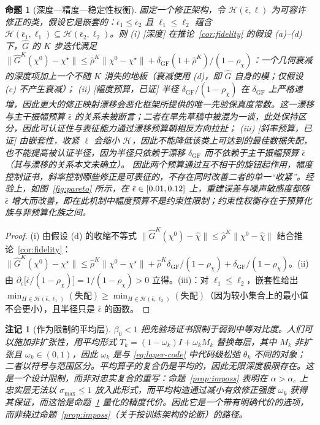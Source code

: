 \documentclass[UTF8,a4paper,11pt]{ctexart}
\newcommand{\norm}[1]{\lVert #1 \rVert}
\newcommand{\numv}[1]{#1}
\newtheorem{Proposition}{命题}[section]
\newtheorem{Remark}{注记}[section]
\begin{document}
\begin{Proposition}[深度—精度—稳定性权衡]\label{prop:tri}
固定一个修正架构，令 $\mathcal{H}(\bar\epsilon,\ell)$ 为可容许修正的类，假设它是嵌套的：$\bar\epsilon_1\le\bar\epsilon_2$ 且 $\ell_1\le\ell_2$ 蕴含
$\mathcal{H}(\bar\epsilon_1,\ell_1)\subseteq\mathcal{H}(\bar\epsilon_2,\ell_2)$。则
(i) \emph{[深度]} 在推论~\ref{cor:fidelity} 的假设 (a)--(d) 下，$\hat G$ 的 $K$ 步迭代满足 $\norm{\hat G^{K}(\chi^{0})-\chi^{\star}}\le\hat\rho^{K}\norm{\chi^{0}-\chi^{\star}}
+\delta_{\mathrm{GF}}(1+\hat\rho^{K})/(1-\rho_\chi)$：一个几何衰减的深度项加上一个不随 $K$ 消失的地板（衰减使用 (d)，即 $\hat G$ 自身的模；仅假设 (c) 不产生衰减）；
(ii) \emph{[幅度预算，已证]} 半径 $\delta_{\mathrm{GF}}/(1-\rho_\chi)$ 在 $\delta_{\mathrm{GF}}$ 上严格递增，因此更大的修正映射漂移会恶化框架所提供的唯一先验保真度常数。这一漂移与主干振幅预算 $\bar\epsilon$ 的关系\emph{未被断言}；二者在早先草稿中被混为一谈，此处保持区分，因此可认证性与表征能力通过漂移预算朝相反方向拉扯；
(iii) \emph{[斜率预算，已证]} 由嵌套性，收紧 $\ell$ 会缩小 $\mathcal{H}$，因此不能降低该类上可达到的最佳数据失配，也不能提高被认证半径，因为半径只依赖于漂移 $\delta_{\mathrm{GF}}$ 而不依赖于主干振幅预算 $\bar\epsilon$（其与漂移的关系本文未确立）。
因此两个预算通过互不相干的旋钮起作用，幅度控制证书，斜率控制哪些修正是可表征的，不存在同时改善二者的单一“收紧”。经验上，如图~\ref{fig:pareto} 所示，在 $\bar\epsilon\in[\numv{\NumEbWorst},\numv{\NumEbBest}]$ 上，重建误差与噪声敏感度都随 $\bar\epsilon$ 增大而改善，即在此机制中幅度预算\emph{不是}约束性限制；约束性权衡存在于预算化族与非预算化族之间。
\end{Proposition}
\begin{proof}
(i) 由假设 (d) 的收缩不等式 $\norm{\hat G^{K}(\chi^{0})-\hat\chi}\le\hat\rho^{K}\norm{\chi^{0}-\hat\chi}$ 结合推论~\ref{cor:fidelity}：$\norm{\hat G^{K}(\chi^{0})-\chi^{\star}}\le\hat\rho^{K}\norm{\chi^{0}-\chi^{\star}}
+\hat\rho^{K}\delta_{\mathrm{GF}}/(1-\rho_\chi)+\delta_{\mathrm{GF}}/(1-\rho_\chi)$。(ii) 由 $\partial_{\bar\epsilon}\big[\bar\epsilon/(1-\rho_\chi)\big]=1/(1-\rho_\chi)>0$ 立得。(iii)：对 $\ell_1\le\ell_2$，嵌套性给出 $\min_{H\in\mathcal{H}(\bar\epsilon,\ell_1)}(\text{失配})\ge
\min_{H\in\mathcal{H}(\bar\epsilon,\ell_2)}(\text{失配})$（因为较小集合上的最小值不会更小），且半径只是 $\bar\epsilon$ 的函数。
\end{proof}

\begin{Remark}[作为限制的平均层]\label{rem:averaged}
$\beta_0<1$ 把先验场证书限制于弱到中等对比度。人们可以\emph{施加}非扩张性，用平均形式 $T_k=(1-\omega_k)I+\omega_kM_k$ 替换每层，其中 $M_k$ 非扩张且 $\omega_k\in(0,1)$，因此 $\omega_k$ 是与 \eqref{eq:layer-code} 中代码级松弛 $\theta_k$ 不同的对象；二者以符号与范围区分。平均算子的复合仍是平均的，因此无限深度极限存在。这是一个\emph{设计限制}，而非对忠实复合的重写：命题~\ref{prop:imposs} 表明在 $\alpha>\alpha_c$ 上忠实层无法以 $\sigma_{\max}\le1$ 放入此形式，而平均构造通过减小有效修正强度 $\omega_k$ 获得其保证，而这恰是命题~\ref{prop:tri} 量化的精度代价。因此它是一个带有明确代价的选项，而非绕过命题~\ref{prop:imposs}（关于按训练架构的论断）的路径。
\end{Remark}
\end{document}
